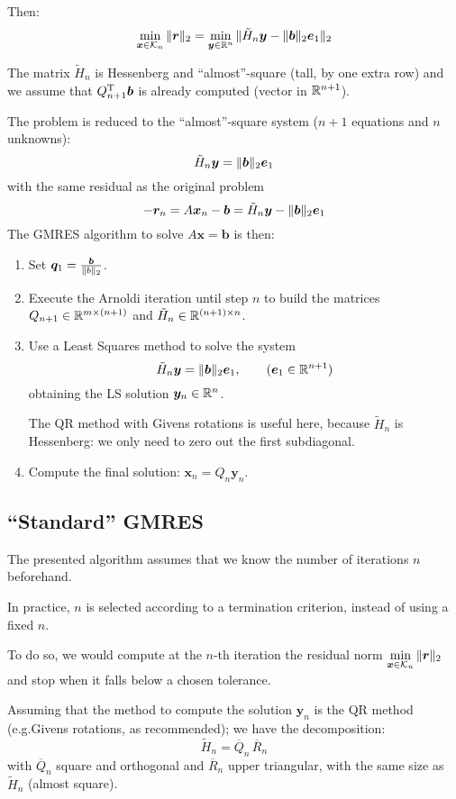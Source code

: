 \documentclass[
  12pt,
  paper=a4,
]{scrartcl} %
\begin{document}
Then:
\[
    \min_{\bm x\in\mathcal{K}_n}\|
        \bm r
    \|_2
    =
    \min_{\bm y\in\mathbb R^{n}}\|
        \tilde H_{n} \bm y - \|\bm b\|_2\bm e_1
    \|_2
\]

The matrix $\tilde H_{n}$ is Hessenberg and ``almost''-square (tall, by one extra row) and we assume that $Q_{n+1}^{\mathrm{T}}\bm b$ is already computed (vector in $\mathbb R^{n+1}$).

The problem is reduced to the ``almost''-square system ($n+1$ equations and $n$ unknowns):
\[
    \tilde H_{n} \bm y = \|\bm b\|_2 \bm e_1
\]
with the same residual as the original problem \[
    -\bm r_n = A\bm x_n - \bm b = \tilde H_{n} \bm y - \|\bm b\|_2 \bm e_1
\]
The GMRES algorithm to solve $A\bm x = \bm b$ is then:
\begin{enumerate}
    \item Set $\bm q_1 = \frac{\bm b}{\|b\|_2}$.

    \item Execute the Arnoldi iteration until step $n$ to build the matrices $Q_{n+1}\in \mathbb R^{m\times (n+1)}$ and $\tilde H_n \in \mathbb R^{(n+1)\times n}$.
    
    \item Use a Least Squares method to solve the system
    \[
        \tilde H_{n} \bm y = \|\bm b\|_2 \bm e_1,
        \qquad  (\bm e_1 \in \mathbb R^{n+1})
    \]
    obtaining the LS solution $\bm y_n \in \mathbb R^{n}$.
    
    The QR method with Givens rotations is useful here, because $\tilde H_{n}$ is Hessenberg: we only need to zero out the first subdiagonal.
    
    \item Compute the final solution: $\bm x_n = Q_n\bm y_n$.
\end{enumerate}

\subsection*{``Standard'' GMRES}
The presented algorithm assumes that we know the number of iterations $n$ beforehand.

In practice, $n$ is selected according to a termination criterion, instead of using a fixed $n$.

To do so, we would compute at the $n$-th iteration the residual norm $
    \displaystyle\min_{\bm x\in\mathcal{K}_n}\|
        \bm r
    \|_2$ and stop when it falls below a chosen tolerance.

Assuming that the method to compute the solution $\bm y_n$ is the QR method (e.g.\@ Givens rotations, as recommended); we have the decomposition:
\[
    \tilde{H}_n = \overline Q_n \, \overline R_n
\]
with $\overline Q_n$ square and orthogonal and $\overline R_n$ upper triangular, with the same size as $\tilde{H}_n$ (almost square).
\end{document}
